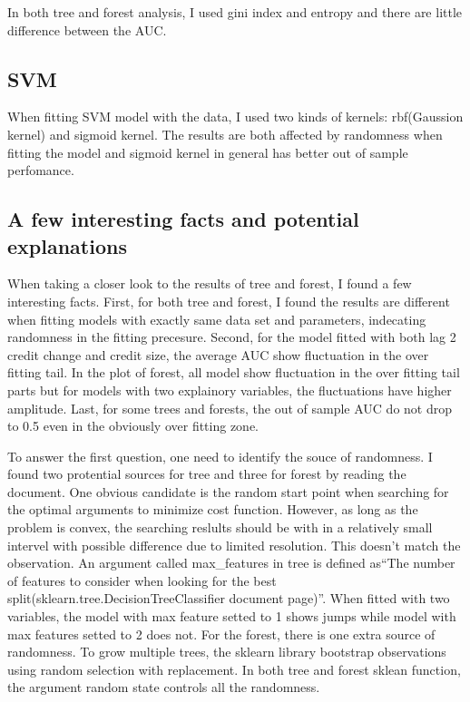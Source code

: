 \documentclass{article}
\begin{document}
In both tree and forest analysis, I used gini index and entropy and
there are little difference between the AUC.

\subsection*{SVM}

When fitting SVM model with the data, I used two kinds of kernels:
rbf(Gaussion kernel) and sigmoid kernel. The results are both affected
by randomness when fitting the model and sigmoid kernel in general has
better out of sample perfomance. 


\subsection*{A few interesting facts and potential explanations}


When taking a closer look to the results of tree and forest, I found a
few interesting facts. First, for both tree and forest, I found the
results are different when fitting models with exactly same data set and
parameters, indecating randomness in the
fitting precesure. Second, for the
model fitted with both lag 2 credit change and credit size, the average
AUC show fluctuation in the over fitting tail. In the plot of forest,
all model show fluctuation in the over fitting tail parts but for models
with two explainory variables, the fluctuations have higher amplitude.
Last, for some trees and forests, the out
of sample AUC do not drop to 0.5 even in the obviously over fitting
zone.

To answer the first question, one need to identify the souce of
randomness. I found two protential sources for tree and three for
forest by reading the document. One obvious candidate is the random start point when searching
for the optimal arguments to minimize cost function. However, as long as
the problem is convex, the searching reslults should be with in a
relatively small intervel with possible difference due to limited resolution. This
doesn't match the observation. An argument
called max\_features in tree is defined as``The number of features to consider when
looking for the best split(sklearn.tree.DecisionTreeClassifier document
page)''. When fitted with two variables, the model with max
feature setted to 1 shows jumps while model with max features setted to 2 does not. For the forest, there is one extra
source of randomness. To grow multiple trees, the sklearn library
bootstrap observations using random selection with replacement. In both tree and forest sklean
function, the argument random state controls all the
randomness.
\end{document}
